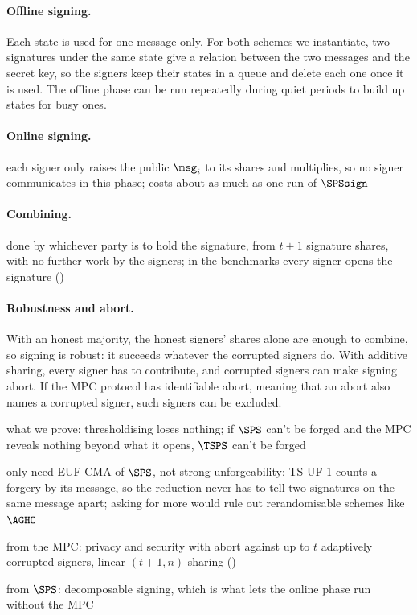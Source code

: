 \paragraph{Offline signing.} Each state is used for one message only. For both schemes we instantiate, two
signatures under the same state give a
relation between the two messages and the secret key, so the signers keep their
states in a queue and delete each one once it is used. The offline phase can be
run repeatedly during quiet periods to build up states for busy ones.

\paragraph{Online signing.}
\begin{outline}
  \item each signer only raises the public $\msg_i$ to its shares and multiplies,
so no signer communicates in this phase; costs about as much as one run of
$\SPSsign$
\end{outline}

\paragraph{Combining.}
\begin{outline}
  \item done by whichever party is to hold the signature, from $t+1$ signature
shares, with no further work by the signers; in the benchmarks every signer
opens the signature ()
\end{outline}

\paragraph{Robustness and abort.} With an honest majority, the honest signers' shares alone are enough to combine,
so signing is robust: it succeeds whatever the corrupted signers do. With
additive sharing, every signer has to contribute, and corrupted signers can make
signing abort. If the MPC protocol has identifiable abort, meaning that an abort
also names a corrupted signer, such signers can be excluded.

\begin{outline}
  \item what we prove: thresholdising loses nothing; if $\SPS$ can't be forged
and the MPC reveals nothing beyond what it opens, $\TSPS$ can't be forged
  \item only need EUF-CMA of $\SPS$, not strong unforgeability: TS-UF-1 counts a
forgery by its message, so the reduction never has to tell two signatures on the
same message apart; asking for more would rule out rerandomisable schemes like
$\AGHO$
  \item from the MPC: privacy and security with abort against up to $t$
adaptively corrupted signers, linear $(t+1, n)$ sharing ()
  \item from $\SPS$: decomposable signing, which is what lets the online phase
run without the MPC
\end{outline}


